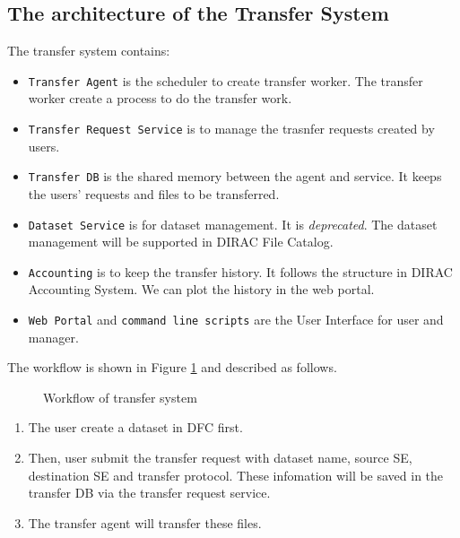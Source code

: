 \subsection{The architecture of the Transfer System}

The transfer system contains:

\begin{itemize}
    \item {\tt Transfer Agent} is the scheduler to create transfer worker.
          The transfer worker create a process to do the transfer work.
    \item {\tt Transfer Request Service} is to manage the trasnfer requests
          created by users.
    \item {\tt Transfer DB} is the shared memory between the agent and 
          service. It keeps the users' requests and files to be transferred.
    \item {\tt Dataset Service} is for dataset management. It is 
          {\em deprecated}. The dataset management will be supported in DIRAC 
          File Catalog.
    \item {\tt Accounting} is to keep the transfer history.
          It follows the structure in DIRAC Accounting System.
          We can plot the history in the web portal.
    \item {\tt Web Portal} and {\tt command line scripts} are the 
          User Interface for user and manager.
\end{itemize}

The workflow is shown in Figure \ref{fig:workflow} and described as follows.
\begin{figure}
    
    \caption{Workflow of transfer system} \label{fig:workflow}
\end{figure}

\begin{enumerate}
\item The user create a dataset in DFC first.
\item Then, user submit the transfer request with dataset name,
source SE, destination SE and transfer protocol.
These infomation will be saved in the transfer DB via
the transfer request service.
\item The transfer agent will transfer these files.
\end{enumerate}
